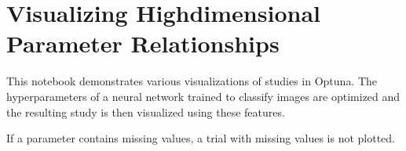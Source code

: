 \documentclass[letterpaper,10pt,english,openany,oneside]{sphinxmanual}
\begin{document}
{
\begin{sphinxVerbatim}[commandchars=\\\{\}]
\llap{\color{nbsphinxin}[ ]:\,\hspace{\fboxrule}\hspace{\fboxsep}}
\end{sphinxVerbatim}
}




\chapter{Visualizing High\sphinxhyphen{}dimensional Parameter Relationships}
\label{\detokenize{Optuna_VizWalkthrough:Visualizing-High-dimensional-Parameter-Relationships}}\label{\detokenize{Optuna_VizWalkthrough::doc}}
This notebook demonstrates various visualizations of studies in Optuna. The hyperparameters of a neural network trained to classify images are optimized and the resulting study is then visualized using these features.

 If a parameter contains missing values, a trial with missing values is not plotted.

{
\begin{sphinxVerbatim}[commandchars=\\\{\}]
\llap{\color{nbsphinxin}[ ]:\,\hspace{\fboxrule}\hspace{\fboxsep}}
\end{sphinxVerbatim}
}

 
\end{document}
